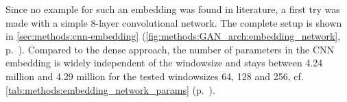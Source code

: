 Since no example for such an embedding was found in literature, a first try was made with a simple 8-layer convolutional network.
The complete setup is shown in \cref{sec:methods:cnn-embedding} (\cref{fig:methods:GAN_arch:embedding_network}, p.~\pageref{fig:methods:GAN_arch:embedding_network}).
Compared to the dense approach, the number of parameters in the CNN embedding is widely independent of the windowsize and 
stays between 4.24 million and 4.29 million for the tested windowsizes 64, 128 and 256, cf. \cref{tab:methods:embedding_network_params} (p.~\pageref{tab:methods:embedding_network_params}).













